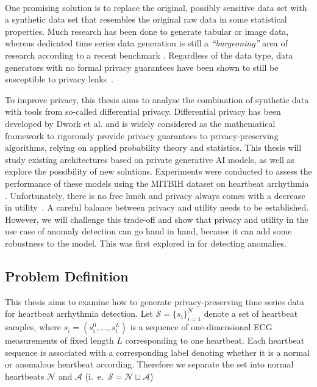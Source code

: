\paragraph{}
One promising solution \parencite[see][]{jordon2022synthetic} is to replace the original, possibly sensitive data set with a synthetic data set that resembles the original raw data in some statistical properties. Much research has been done to generate tabular or image data, whereas dedicated time series data generation is still a \textit{``burgeoning''} area of research according to a recent benchmark \parencite[][]{ang2023tsgbench}. Regardless of the data type, data generators with no formal privacy guarantees have been shown to still be susceptible to privacy leaks~\cite{stadler2022synthetic}. 

To improve privacy, this thesis aims to analyse the combination of synthetic data with tools from so-called differential privacy. Differential privacy has been developed by Dwork et al. \parencite{dwork2006differential} and is widely considered as the mathematical framework to rigorously provide privacy guarantees to privacy-preserving algorithms, relying on applied probability theory and statistics. This thesis will study existing architectures based on private generative AI models, as well as explore the possibility of new solutions. Experiments were conducted to assess the performance of these models using the MITBIH dataset on heartbeat arrhythmia \parencite[][]{moody2001impact}. Unfortunately, there is no free lunch and privacy always comes with a decrease in utility~\cite{stadler2022synthetic}. A careful balance between privacy and utility needs to be established. However, we will challenge this trade-off and show that privacy and utility in the use case of anomaly detection can go hand in hand, because it can add some robustness to the model. This was first explored in \Parencite{du2019robust} for detecting anomalies.


\subsection{Problem Definition}

This thesis aims to examine how to generate privacy-preserving time series data for heartbeat arrhythmia detection. Let $\mathcal{S}={\{s_i\}}_{i=1}^N$ denote a set of heartbeat samples, where $s_i=(s_i^0,..., s_i^L)$ is a sequence of one-dimensional ECG measurements of fixed length $L$ corresponding to one heartbeat. Each heartbeat sequence is associated with a corresponding label denoting whether it is a normal or anomalous heartbeat according. Therefore we separate the set into normal heartbeats $\mathcal{N}$ and $\mathcal{A}$ (i.\ e.\ $\mathcal{S} = \mathcal{N} \sqcup \mathcal{A}$)

